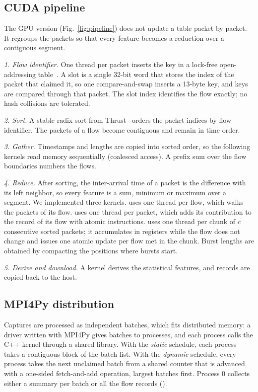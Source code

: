 \subsection{CUDA pipeline}
The GPU version (Fig.~\ref{fig:pipeline}) does not update a table packet by
packet. It regroups the packets so that every feature becomes a reduction over
a contiguous segment.

\emph{1. Flow identifier.} One thread per packet inserts the key in a
lock-free open-addressing table~\cite{alcantara}. A slot is a single 32-bit
word that stores the index of the packet that claimed it, so one
compare-and-swap inserts a 13-byte key, and keys are compared through that
packet. The slot index identifies the flow exactly; no hash collisions are
tolerated.

\emph{2. Sort.} A stable radix sort from Thrust~\cite{thrust} orders the packet
indices by flow identifier. The packets of a flow become contiguous and remain
in time order.

\emph{3. Gather.} Timestamps and lengths are copied into sorted order, so the
following kernels read memory sequentially (coalesced access). A prefix sum
over the flow boundaries numbers the flows.

\emph{4. Reduce.} After sorting, the inter-arrival time of a packet is the
difference with its left neighbor, so every feature is a sum, minimum or
maximum over a segment. We implemented three kernels.  uses one
thread per flow, which walks the packets of its flow.  uses
one thread per packet, which adds its contribution to the record of its flow
with atomic instructions.  uses one thread per chunk of $c$
consecutive sorted packets; it accumulates in registers while the flow does
not change and issues one atomic update per flow met in the chunk. Burst
lengths are obtained by compacting the positions where bursts start.

\emph{5. Derive and download.} A kernel derives the statistical features, and
records are copied back to the host.

\subsection{MPI4Py distribution}
Captures are processed as independent batches, which fits distributed
memory: a driver written with MPI4Py gives batches to processes, and each
process calls the C++ kernel through a shared library. With the \emph{static}
schedule, each process takes a contiguous block of the batch list. With the
\emph{dynamic} schedule, every process takes the next unclaimed batch from a
shared counter that is advanced with a one-sided fetch-and-add operation,
largest batches first. Process 0 collects either a summary per batch or all
the flow records ().

